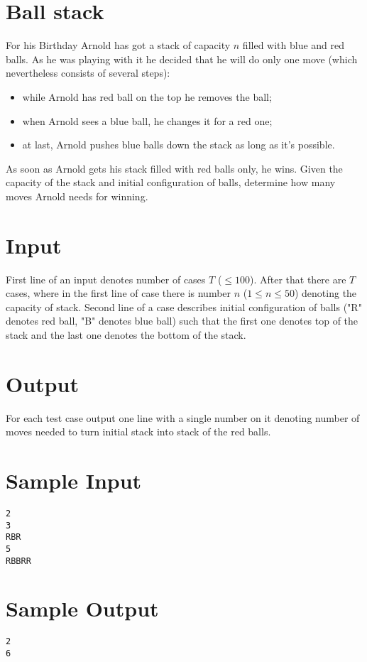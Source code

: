 \documentclass{article}
\begin{document}
\section*{\fontsize{12}{25}Ball stack}
For his Birthday Arnold has got a stack of capacity $n$ filled with blue and red balls. As he was playing with it he decided that he will do only one move (which nevertheless consists of several steps): 
\begin{itemize}
\item while Arnold has red ball on the top he removes the ball;
\item when Arnold sees a blue ball, he changes it for a red one;
\item at last, Arnold pushes blue balls down the stack as long as it's possible.
\end{itemize}
As soon as Arnold gets his stack filled with red balls only, he wins. Given the capacity of the stack and initial configuration of balls, determine how many moves Arnold needs for winning.

\section*{Input}
First line of an input denotes number of cases $T$ ($\leq 100$). After that there are $T$ cases, where in the first line of case there is number $n$ ($1 \leq n \leq 50$) denoting the capacity of stack. Second line of a case describes initial configuration of balls ("R" denotes red ball, "B" denotes blue ball) such that the first one denotes top of the stack and the last one denotes the bottom of the stack.

\section*{Output}
For each test case output one line with a single number on it denoting number of moves needed to turn initial stack into stack of the red balls. \bigskip

\section*{Sample Input}
\begin{verbatim}
2
3
RBR
5
RBBRR
\end{verbatim}

\section*{Sample Output}

\begin{verbatim}
2
6
\end{verbatim}
\end{document}
